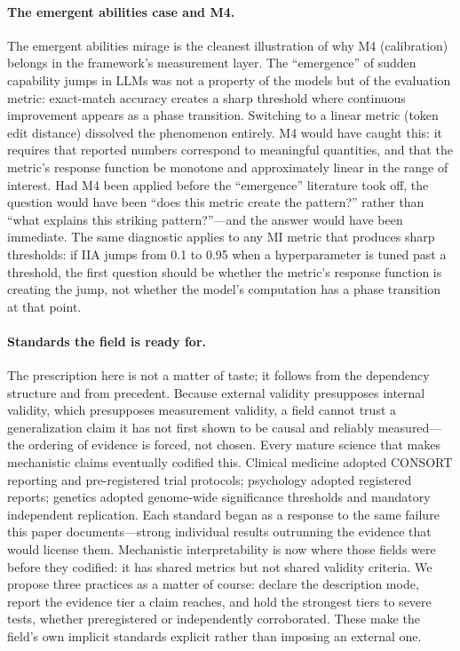 \documentclass{article}
\begin{document}
\paragraph{The emergent abilities case and M4.}
The \citet{schaeffer2023emergent} emergent abilities mirage is the cleanest illustration of why M4 (calibration) belongs in the framework's measurement layer. The ``emergence'' of sudden capability jumps in LLMs was not a property of the models but of the evaluation metric: exact-match accuracy creates a sharp threshold where continuous improvement appears as a phase transition. Switching to a linear metric (token edit distance) dissolved the phenomenon entirely. M4 would have caught this: it requires that reported numbers correspond to meaningful quantities, and that the metric's response function be monotone and approximately linear in the range of interest. Had M4 been applied before the ``emergence'' literature took off, the question would have been ``does this metric create the pattern?'' rather than ``what explains this striking pattern?''---and the answer would have been immediate. The same diagnostic applies to any MI metric that produces sharp thresholds: if IIA jumps from 0.1 to 0.95 when a hyperparameter is tuned past a threshold, the first question should be whether the metric's response function is creating the jump, not whether the model's computation has a phase transition at that point.

\paragraph{Standards the field is ready for.}
The prescription here is not a matter of taste; it follows from the dependency structure and from precedent. Because external validity presupposes internal validity, which presupposes measurement validity, a field cannot trust a generalization claim it has not first shown to be causal and reliably measured---the ordering of evidence is forced, not chosen. Every mature science that makes mechanistic claims eventually codified this. Clinical medicine adopted CONSORT reporting and pre-registered trial protocols; psychology adopted registered reports; genetics adopted genome-wide significance thresholds and mandatory independent replication. Each standard began as a response to the same failure this paper documents---strong individual results outrunning the evidence that would license them. Mechanistic interpretability is now where those fields were before they codified: it has shared metrics but not shared validity criteria. We propose three practices as a matter of course: declare the description mode, report the evidence tier a claim reaches, and hold the strongest tiers to severe tests, whether preregistered or independently corroborated. These make the field's own implicit standards explicit rather than imposing an external one.
\end{document}

